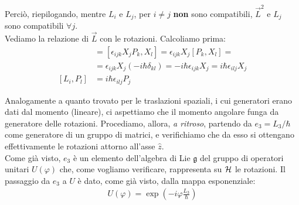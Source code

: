 \documentclass[../../FisicaTeorica.tex]{subfiles}
\begin{document}
Perciò, riepilogando, mentre $L_i$ e $L_j$, per $i\neq j$ \textbf{non} sono compatibili, $\vec{L}^2$ e $L_j$ sono compatibili $\forall j$.\\

Vediamo la relazione di $\vec{L}$ con le rotazioni. Calcoliamo prima:
\begin{align*}
[L_i, X_l]&=[\epsilon_{ijk} X_j P_k, X_l] = \epsilon_{ijk} X_j[P_k, X_l] =\\
&= \epsilon_{ijk} X_j (-i\hbar \delta_{kl}) = - i\hbar \epsilon_{ijk}X_j = i\hbar \epsilon_{ilj}X_j\\
[L_i, P_l] &= i\hbar \epsilon_{ilj} P_j
\end{align*}

Analogamente a quanto trovato per le traslazioni spaziali, i cui generatori erano dati dal momento (lineare), ci aspettiamo che il momento angolare funga da generatore delle rotazioni. Procediamo, allora, \textit{a ritroso}, partendo da $e_3 = L_3/\hbar$ come generatore di un gruppo di matrici, e verifichiamo che da esso si ottengano effettivamente le rotazioni attorno all'asse $\hat{z}$.\\
Come già visto, $e_3$ è un elemento dell'algebra di Lie $\mathfrak{g}$ del gruppo di operatori unitari $U(\varphi)$ che, come vogliamo verificare, rappresenta su $\mathcal{H}$ le rotazioni. Il passaggio da $e_3$ a $U$ è dato, come già visto, dalla mappa esponenziale:
\begin{align*}
U(\varphi) = \exp\left(-i\varphi\frac{L_3}{\hbar}\right)
\end{align*}
\end{document}
